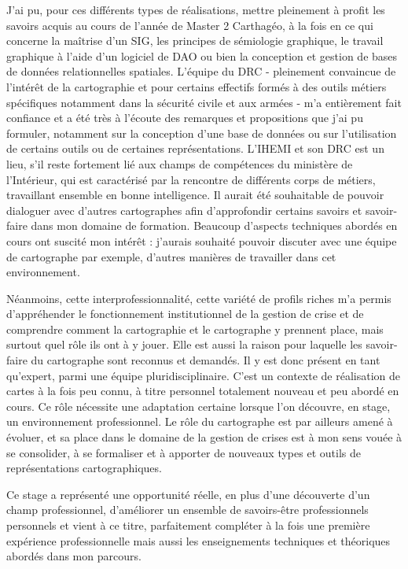 \documentclass[10pt,a4paper]{report} %
\begin{document}
J’ai pu, pour ces différents types de réalisations, mettre pleinement à profit les savoirs acquis au cours de l’année de Master 2 Carthagéo, à la fois en ce qui concerne la maîtrise d’un SIG, les principes de sémiologie graphique, le travail graphique à l’aide d’un logiciel de DAO ou bien la conception et gestion de bases de données relationnelles spatiales. L’équipe du DRC - pleinement convaincue de l’intérêt de la cartographie et pour certains effectifs formés à des outils métiers spécifiques notamment dans la sécurité civile et aux armées - m’a entièrement fait confiance et a été très à l’écoute des remarques et propositions que j’ai pu formuler, notamment sur la conception d’une base de données ou sur l’utilisation de certains outils ou de certaines représentations. L’IHEMI et son DRC est un lieu, s’il reste fortement lié aux champs de compétences du ministère de l’Intérieur, qui est caractérisé par la rencontre de différents corps de métiers, travaillant ensemble en bonne intelligence. Il aurait été souhaitable de pouvoir dialoguer avec d’autres cartographes afin d’approfondir certains savoirs et savoir-faire dans mon domaine de formation. Beaucoup d’aspects techniques abordés en cours ont suscité mon intérêt : j’aurais souhaité pouvoir discuter avec une équipe de cartographe par exemple, d’autres manières de travailler dans cet environnement.

Néanmoins, cette interprofessionnalité, cette variété de profils riches m’a permis d’appréhender le fonctionnement institutionnel de la gestion de crise et de comprendre comment la cartographie et le cartographe y prennent place, mais surtout quel rôle ils ont à y jouer. Elle est aussi la raison pour laquelle les savoir-faire du cartographe sont reconnus et demandés. Il y est donc présent en tant qu’expert, parmi une équipe pluridisciplinaire. C’est un contexte de réalisation de cartes à la fois peu connu, à titre personnel totalement nouveau et peu abordé en cours. Ce rôle nécessite une adaptation certaine lorsque l’on découvre, en stage, un environnement professionnel. Le rôle du cartographe est par ailleurs amené à évoluer, et sa place dans le domaine de la gestion de crises est à mon sens vouée à se consolider, à se formaliser et à apporter de nouveaux types et outils de représentations cartographiques.

Ce stage a représenté une opportunité réelle, en plus d’une découverte d’un champ professionnel, d’améliorer un ensemble de savoirs-être professionnels personnels et vient à ce titre, parfaitement compléter à la fois une première expérience professionnelle mais aussi les enseignements techniques et théoriques abordés dans mon parcours.
\end{document}
